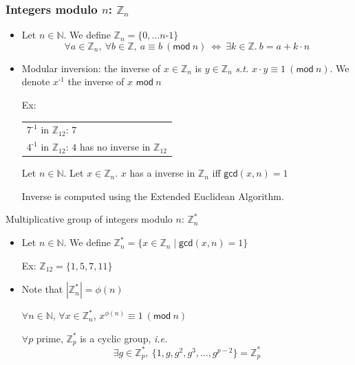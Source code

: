 \documentclass[aspectratio=169, lualatex, 10pt,dvipsnames,svgnames]{beamer} %
\def\envert#1{\textcolor{vert}{#1}}
\def\enrouge#1{\textcolor{rouge}{#1}}
\begin{document}
\begin{frame}
  \frametitle{Integers modulo $n$: $\mathbb Z_n$}
  
  \begin{itemize}
  \item Let $n\in\mathbb N$. We define $\mathbb Z_n = \{0, \dots n\text{-}1\}$
    \[
    \forall a\in \mathbb Z_n,\ \forall b\in \mathbb Z,\ a \equiv b\ (\mathsf{mod}\ n)\ \Leftrightarrow\ \exists k\in\mathbb Z.\ b= a + k\cdot n
    \]
    \pause

  \item Modular inversion: the inverse of $x\in \mathbb Z_n$ is $y\in \mathbb Z_n$ \emph{s.t.} $x\cdot y \equiv 1\ (\mathsf{mod}\ n)$. We denote $x^{\text{-}1}$ the inverse of $x$ $\mathsf{mod}\ n$
    \pause

    \envert{Ex:\begin{tabular}[t]{l}
        $7^{\text{-}1}$ in $\mathbb Z_{12}$: \pause $7$\pause \\
        $4^{\text{-}1}$ in $\mathbb Z_{12}$: \pause \enrouge{$4$ has no inverse in $\mathbb Z_{12}$}
      \end{tabular}}
    \pause
  \begin{theorem}
    Let $n\in \mathbb N$. Let $x\in \mathbb Z_n$. $x$ has a inverse in $\mathbb Z_n$ iff $\mathsf{gcd}(x, n) = 1$
  \end{theorem}
  Inverse is computed using the Extended Euclidean Algorithm.
\end{itemize}
\end{frame}

\begin{frame}{Multiplicative group of integers modulo $n$: $\mathbb Z_n^*$}

  \begin{itemize}
  \item Let $n\in\mathbb N$. We define $\mathbb Z_n^* = \{x\in\mathbb Z_n\mid \mathsf{gcd}(x, n)=1\}$

    \envert{Ex: $\mathbb Z_{12} = \{1, 5, 7, 11\}$}
    \medskip{}
    \pause

  \item Note that $|\mathbb Z_n^*| = \phi(n)$
    \bigskip{}
    \pause

    \begin{theorem}[Euler]
      $\forall n\in\mathbb N$, $\forall x\in \mathbb Z_n^*$, $x^{\phi(n)} \equiv 1\ (\mathsf{mod}\ n)$
    \end{theorem}
    \bigskip{}
    \pause

    \begin{theorem}[Euler]
      $\forall p$ prime, $\mathbb Z_p^*$ is a cyclic group, \emph{i.e.}
      \[
      \exists g\in\mathbb Z_p^*,\ \{1, g, g^2, g^3, \dots, g^{p-2}\} = \mathbb Z_p^*
      \]
    \end{theorem}
  \end{itemize}
\end{frame}
\end{document}
